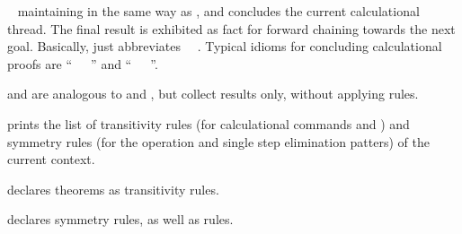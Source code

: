 \begin{isabellebody}
\begin{isamarkuptext}
\begin{description}
  \item \hyperlink{command.finally}{\mbox{}}~ maintaining \hyperlink{fact.calculation}{\mbox{}} in the same way as \hyperlink{command.also}{\mbox{}}, and concludes the
  current calculational thread.  The final result is exhibited as fact
  for forward chaining towards the next goal. Basically, \hyperlink{command.finally}{\mbox{}} just abbreviates \hyperlink{command.also}{\mbox{}}~\hyperlink{command.from}{\mbox{}}~\hyperlink{fact.calculation}{\mbox{}}.  Typical idioms for concluding
  calculational proofs are ``\hyperlink{command.finally}{\mbox{}}~\hyperlink{command.show}{\mbox{}}~~\hyperlink{command.dot}{\mbox{\isa{\isacommand{{\isachardot}}}}}'' and ``\hyperlink{command.finally}{\mbox{}}~\hyperlink{command.have}{\mbox{}}~\isa{{\isasymphi}}~\hyperlink{command.dot}{\mbox{\isa{\isacommand{{\isachardot}}}}}''.

  \item \hyperlink{command.moreover}{\mbox{}} and \hyperlink{command.ultimately}{\mbox{}} are
  analogous to \hyperlink{command.also}{\mbox{}} and \hyperlink{command.finally}{\mbox{}}, but collect
  results only, without applying rules.

  \item \hyperlink{command.print-trans-rules}{\mbox{}} prints the list of transitivity
  rules (for calculational commands \hyperlink{command.also}{\mbox{}} and \hyperlink{command.finally}{\mbox{}}) and symmetry rules (for the \hyperlink{attribute.symmetric}{\mbox{}}
  operation and single step elimination patters) of the current
  context.

  \item \hyperlink{attribute.trans}{\mbox{}} declares theorems as transitivity rules.

  \item \hyperlink{attribute.sym}{\mbox{}} declares symmetry rules, as well as
  \hyperlink{attribute.Pure.elim}{\mbox{}}\isa{{\isachardoublequote}{\isacharquery}{\isachardoublequote}} rules.


\end{description}
\end{isamarkuptext}
\end{isabellebody}
